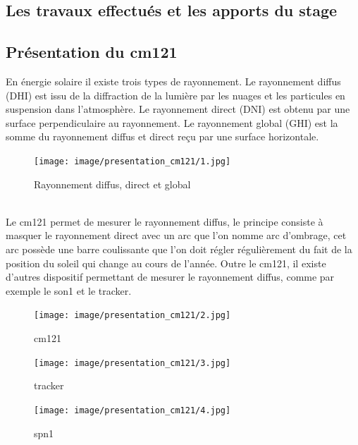 \documentclass[12pt,a4paper]{article}
\begin{document}
\begin{flushleft}
\section{Les travaux effectués et les apports du stage}

\subsection{Présentation du cm121}

En énergie solaire il existe trois types de rayonnement. Le rayonnement diffus (DHI) est issu de la diffraction de la lumière par les nuages et les particules en suspension dans l'atmosphère. Le rayonnement direct (DNI) est obtenu par une surface perpendiculaire au rayonnement. Le rayonnement global (GHI) est la somme du rayonnement diffus et direct reçu  par une surface horizontale.\\

\begin{figure}[H]
\centering
\texttt{[image: image/presentation\_cm121/1.jpg]} 
\caption{Rayonnement diffus, direct et global}
\end{figure}

~\\
Le cm121 permet de mesurer le rayonnement diffus, le principe consiste à masquer le rayonnement direct avec un arc que l'on nomme arc d'ombrage, cet arc possède une barre coulissante que l'on doit régler régulièrement du fait de la position du soleil qui change au cours de l'année. Outre le cm121, il existe d'autres dispositif permettant de mesurer le rayonnement diffus, comme par exemple le son1 et le tracker.

\begin{figure}[H]
    \begin{minipage}[c]{.2\linewidth}
        \centering
        \texttt{[image: image/presentation\_cm121/2.jpg]}  
        \caption{cm121}
    \end{minipage}
    \hfill%
    \begin{minipage}[c]{.2\linewidth}
        \centering
        \texttt{[image: image/presentation\_cm121/3.jpg]}  
        \caption{tracker}
    \end{minipage}
    \hfill%
    \begin{minipage}[c]{.3\linewidth}
        \centering
        \texttt{[image: image/presentation\_cm121/4.jpg]} 
        \caption{spn1}
    \end{minipage}
\end{figure}



\end{flushleft}
\end{document}
